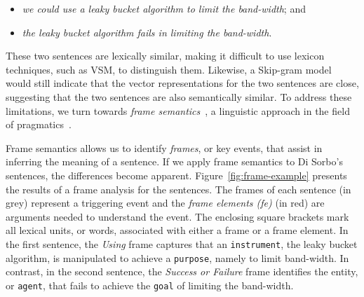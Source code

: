 \begin{itemize}
\item  \textit{we could use a leaky bucket algorithm to limit the band-width}; and
\item \textit{the leaky bucket algorithm fails in limiting the band-width}.
\end{itemize}

These two sentences are lexically similar, making it
difficult to use lexicon techniques, such as \acs{VSM}, to distinguish them. Likewise, a Skip-gram model would still indicate that the vector representations for the two sentences are close, suggesting that the two sentences are also semantically similar. 
To address these limitations, we turn towards \textit{frame
semantics}~\cite{fillmore1976frame, Baker1998}, a 
linguistic approach in the field of pragmatics~\cite{ariel2008pragmatics, austin1975pragmatics}.



Frame semantics allows us to identify \textit{frames},
or key events, that assist in inferring the meaning of a sentence.
If we apply frame semantics to Di Sorbo's sentences, the differences become apparent.
Figure~\ref{fig:frame-example} presents the results of a frame
analysis for the sentences.
The frames of each sentence (in grey) represent a
triggering event and the \textit{frame elements (fe)} (in red) are arguments needed
to understand the event. The enclosing square brackets
mark all lexical units, or words,
associated with either a frame or a frame element.
In the first sentence, the \textit{Using} frame
captures that an \texttt{instrument}, the leaky bucket algorithm, is
manipulated to achieve a \texttt{purpose}, namely to limit band-width.
In contrast, in the second sentence, the \textit{Success or Failure}
frame identifies the entity, or \texttt{agent}, that fails to achieve the \texttt{goal} of limiting the band-width. 








